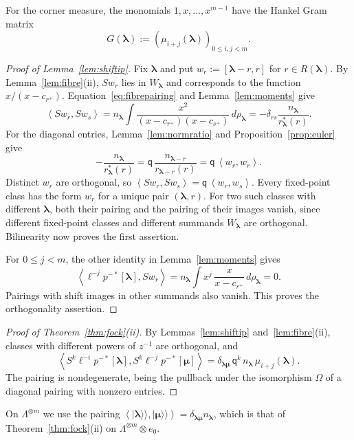 \documentclass[11pt]{amsart}
\theoremstyle{definition}
\theoremstyle{remark}
\newcommand{\Mq}{\mathsf q}                      %
\newcommand{\La}{\Lambda}                        %
\newcommand{\bl}{{\boldsymbol{\lambda}}}         %
\newcommand{\bmu}{{\boldsymbol{\mu}}}
\newcommand{\Rem}[1]{R(#1)}                      %
\newcommand{\res}[2]{r_{#1}(#2)}                 %
\newcommand{\cores}[2]{r^*_{#1}(#2)}             %
\newcommand{\cornermeas}[1]{\rho_{#1}}           %
\newcommand{\mom}[2]{\mu_{#1}(#2)}               %
\newcommand{\srcnorm}[1]{n_{#1}}                 %
\newcommand{\Gram}[1]{G(#1)}                     %
\newcommand{\ip}[2]{\left\langle #1,#2\right\rangle}
\newcommand{\ceig}[1]{c_{#1}}                    %
\newcommand{\bplus}[1]{{#1}^{+}}                 %
\newcommand{\Wfib}[1]{W_{#1}}                    %
\newcommand{\auxe}[1]{e_{#1}}                    %
\newcommand{\kket}[1]{\lvert #1\rangle\!\rangle} %
\newcommand{\fix}[1]{[#1]}                       %
\newcommand{\pt}[2]{[#1,#2]}                     %
\newcommand{\taut}{\ell}                         %
\newcommand{\pulm}{p^{-*}}                       %
\newcommand{\Shift}{S}                           %
\newcommand{\Omap}{\Omega}                       %
\begin{document}
For the corner measure, the monomials \(1,x,\dots,x^{m-1}\) have the Hankel Gram matrix
\begin{equation}\label{eq:Gram}
 \Gram{\bl}:=(\mom{i+j}{\bl})_{0\leq i,j<m}.
\end{equation}

\begin{proof}[Proof of Lemma~\ref{lem:shiftip}]
Fix \(\bl\) and put \(w_r:=\pt{\bl-r}{r}\) for \(r\in\Rem{\bl}\).
By Lemma~\ref{lem:fibre}(ii), \(\Shift w_r\) lies in \(\Wfib{\bl}\) and
corresponds to the function \(x/(x-\ceig{\bplus{r}})\).
Equation~\eqref{eq:fibrepairing} and Lemma~\ref{lem:moments} give
\[
 \ip{\Shift w_r}{\Shift w_s}
 =\srcnorm{\bl}\int
   \frac{x^2}{(x-\ceig{\bplus{r}})(x-\ceig{\bplus{s}})}\,d\cornermeas{\bl}
 =-\delta_{rs}\frac{\srcnorm{\bl}}{\cores{\bl}{r}}.
\]
For the diagonal entries, Lemma~\ref{lem:normratio} and
Proposition~\ref{prop:euler} give
\[
 -\frac{\srcnorm{\bl}}{\cores{\bl}{r}}
 =\Mq\,\frac{\srcnorm{\bl-r}}{\res{\bl-r}{r}}
 =\Mq\,\ip{w_r}{w_r}.
\]
Distinct \(w_r\) are orthogonal, so
\(\ip{\Shift w_r}{\Shift w_s}=\Mq\,\ip{w_r}{w_s}\).
Every fixed-point class has the form \(w_r\) for a unique pair \((\bl,r)\).
For two such classes with different \(\bl\), both their pairing and the pairing
of their images vanish, since different fixed-point classes and different
summands \(\Wfib{\bl}\) are orthogonal. Bilinearity now proves the first assertion.

For \(0\leq j<m\), the other identity in Lemma~\ref{lem:moments} gives
\[
 \ip{\taut^{-j}\pulm\fix{\bl}}{\Shift w_r}
 =\srcnorm{\bl}\int x^j\,\frac{x}{x-\ceig{\bplus{r}}}\,d\cornermeas{\bl}=0.
\]
Pairings with shift images in other summands also vanish. This proves the
orthogonality assertion.
\end{proof}

\begin{proof}[Proof of Theorem~\ref{thm:fock}(ii)]
By Lemmas~\ref{lem:shiftip} and~\ref{lem:fibre}(ii), classes with different powers of \(z^{-1}\) are
orthogonal, and
\[
 \ip{\Shift^k\taut^{-i}\pulm\fix{\bl}}{\Shift^k\taut^{-j}\pulm\fix{\bmu}}
 =\delta_{\bl\bmu}\,\Mq^k\,\srcnorm{\bl}\,\mom{i+j}{\bl}.
\]
The pairing is nondegenerate, being the pullback under the isomorphism \(\Omap\) of a diagonal
pairing with nonzero entries.
\end{proof}

On \(\La^{\otimes m}\) we use the pairing \(\ip{\kket{\bl}}{\kket{\bmu}}=\delta_{\bl\bmu}\srcnorm{\bl}\),
which is that of Theorem~\ref{thm:fock}(ii) on \(\La^{\otimes m}\otimes\auxe{0}\).
\end{document}
